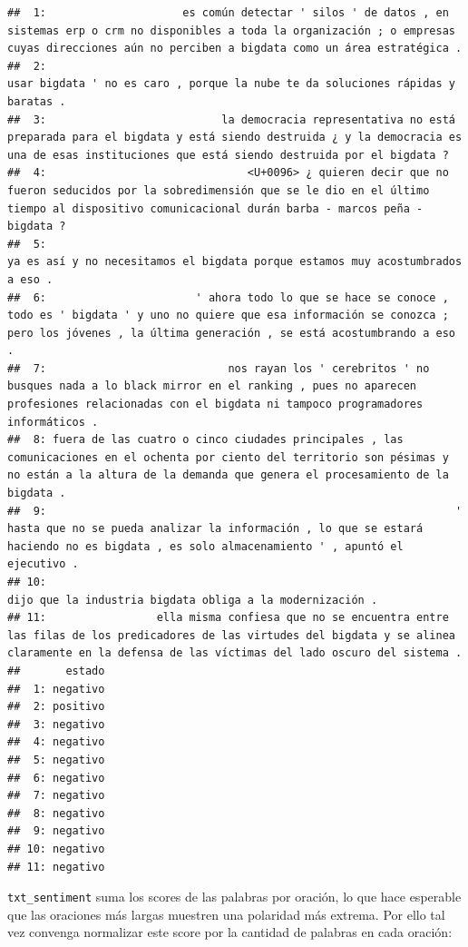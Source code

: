 \documentclass[
]{book}
\begin{document}
\begin{verbatim}
##  1:                     es común detectar ' silos ' de datos , en sistemas erp o crm no disponibles a toda la organización ; o empresas cuyas direcciones aún no perciben a bigdata como un área estratégica .
##  2:                                                                                                                            usar bigdata ' no es caro , porque la nube te da soluciones rápidas y baratas .
##  3:                           la democracia representativa no está preparada para el bigdata y está siendo destruida ¿ y la democracia es una de esas instituciones que está siendo destruida por el bigdata ?
##  4:                               <U+0096> ¿ quieren decir que no fueron seducidos por la sobredimensión que se le dio en el último tiempo al dispositivo comunicacional durán barba - marcos peña - bigdata ?
##  5:                                                                                                                             ya es así y no necesitamos el bigdata porque estamos muy acostumbrados a eso .
##  6:                       ' ahora todo lo que se hace se conoce , todo es ' bigdata ' y uno no quiere que esa información se conozca ; pero los jóvenes , la última generación , se está acostumbrando a eso .
##  7:                            nos rayan los ' cerebritos ' no busques nada a lo black mirror en el ranking , pues no aparecen profesiones relacionadas con el bigdata ni tampoco programadores informáticos .
##  8: fuera de las cuatro o cinco ciudades principales , las comunicaciones en el ochenta por ciento del territorio son pésimas y no están a la altura de la demanda que genera el procesamiento de la bigdata .
##  9:                                                               ' hasta que no se pueda analizar la información , lo que se estará haciendo no es bigdata , es solo almacenamiento ' , apuntó el ejecutivo .
## 10:                                                                                                                                                  dijo que la industria bigdata obliga a la modernización .
## 11:                 ella misma confiesa que no se encuentra entre las filas de los predicadores de las virtudes del bigdata y se alinea claramente en la defensa de las víctimas del lado oscuro del sistema .
##       estado
##  1: negativo
##  2: positivo
##  3: negativo
##  4: negativo
##  5: negativo
##  6: negativo
##  7: negativo
##  8: negativo
##  9: negativo
## 10: negativo
## 11: negativo
\end{verbatim}

\texttt{txt\_sentiment} suma los scores de las palabras por oración, lo que hace esperable que las oraciones más largas muestren una polaridad más extrema. Por ello tal vez convenga normalizar este score por la cantidad de palabras en cada oración:
\end{document}
